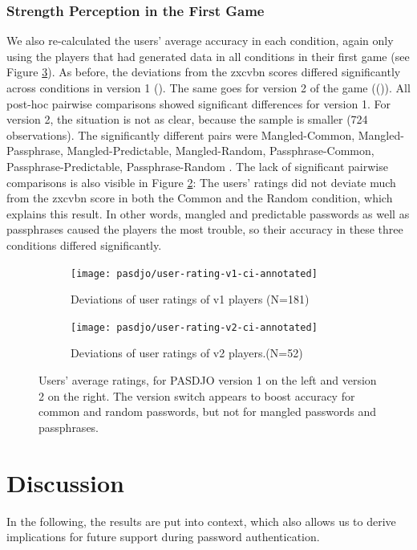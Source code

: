 \subsubsection{Strength Perception in the First Game}
We also re-calculated the users' average accuracy in each condition, again only using the players that had generated data in all conditions in their first game (see Figure \ref{fig:pasdjo:v1-v2-deviations}). As before, the deviations from the zxcvbn scores differed significantly across conditions in version 1 (). The same goes for version 2 of the game (()). All post-hoc pairwise comparisons showed significant differences  for version 1. For version 2, the situation is not as clear, because the sample is smaller (724 observations). The significantly different pairs were Mangled-Common, Mangled-Passphrase, Mangled-Predictable, Mangled-Random, Passphrase-Common, Passphrase-Predictable, Passphrase-Random . The lack of significant pairwise comparisons is also visible in Figure \ref{fig:pasdjo:v2-performance}: The users' ratings did not deviate much from the zxcvbn score in both the Common and the Random condition, which explains this result. In other words, mangled and predictable passwords as well as passphrases caused the players the most trouble, so their accuracy in these three conditions differed significantly. 
\begin{figure}[htbp]
	\begin{subfigure}[t]{0.49\linewidth}
		\texttt{[image: pasdjo/user-rating-v1-ci-annotated]}
		\caption{\label{fig:pasdjo:1y-performance}Deviations of user ratings of v1 players (N=181)}
	\end{subfigure}
	\begin{subfigure}[t]{0.49\linewidth}
		\texttt{[image: pasdjo/user-rating-v2-ci-annotated]}
		\caption{\label{fig:pasdjo:v2-performance}Deviations of user ratings of v2 players.(N=52)}
	\end{subfigure}
	\caption{\label{fig:pasdjo:v1-v2-deviations} Users' average ratings, for PASDJO version 1 on the left and version 2 on the right. The version switch appears to boost accuracy for common and random passwords, but not for mangled passwords and passphrases.}
\end{figure}


\section{Discussion}
In the following, the results are put into context, which also allows us to derive implications for future support during password authentication. 
